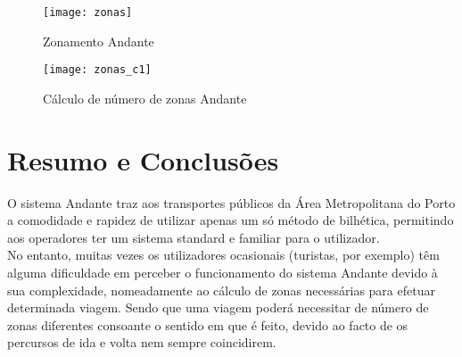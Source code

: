 \begin{figure}[t]
  \begin{center}
    \leavevmode
    \texttt{[image: zonas]}
    \caption{Zonamento Andante}
    \label{fig:zonas}
  \end{center}
\end{figure}

\begin{figure}[t]
  \begin{center}
    \leavevmode
    \texttt{[image: zonas\_c1]}
    \caption{Cálculo de número de zonas Andante \cite{calczonas}}
    \label{fig:zonas_c1}
  \end{center}
\end{figure}

\section{Resumo e Conclusões}

O sistema Andante traz aos transportes públicos da Área Metropolitana do Porto a comodidade e rapidez de utilizar apenas um só método de bilhética, permitindo aos operadores ter um sistema standard e familiar para o utilizador.
\\No entanto, muitas vezes os utilizadores ocasionais (turistas, por exemplo) têm alguma dificuldade em perceber o funcionamento do sistema Andante devido à sua complexidade, nomeadamente ao cálculo de zonas necessárias para efetuar determinada viagem. Sendo que uma viagem poderá necessitar de número de zonas diferentes consoante o sentido em que é feito, devido ao facto de os percursos de ida e volta nem sempre coincidirem.